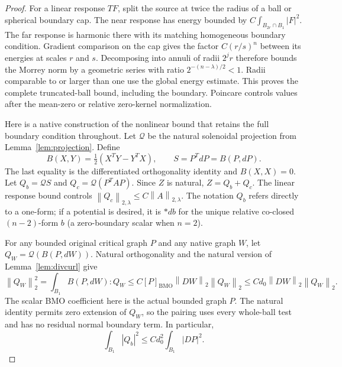 \documentclass[11pt,a4paper]{article}
\numberwithin{equation}{section}
\theoremstyle{definition}
\theoremstyle{remark}
\newcommand{\BMO}{\mathrm{BMO}}
\newcommand{\norm}[1]{\left\lVert#1\right\rVert}
\begin{document}
\begin{proof}
For a linear response $TF$, split the source at twice the radius of a
ball or spherical boundary cap. The near response has energy bounded
by $C\int_{B_{2r}\cap B_1}|F|^2$. The far response is harmonic there
with its matching homogeneous boundary condition. Gradient comparison
on the cap gives the factor $C(r/s)^n$ between its energies at scales
$r$ and $s$. Decomposing into annuli of radii $2^jr$ therefore bounds
the Morrey norm by a geometric series with ratio
$2^{-(n-\lambda)/2}<1$. Radii comparable to or larger than one use
the global energy estimate. This proves the complete truncated-ball
bound, including the boundary. Poincare controls values after the
mean-zero or relative zero-kernel normalization.

Here is a native construction of the nonlinear bound that retains
the full boundary condition throughout. Let $\mathcal Q$ be the
natural solenoidal projection from Lemma~\ref{lem:projection}. Define
\[
 B(X,Y)=\tfrac12(X^TY-Y^TX),\qquad S=P^TdP=B(P,dP).
\]
The last equality is the differentiated orthogonality identity and
$B(X,X)=0$. Let $Q_b=\mathcal Q S$ and
$Q_c=\mathcal Q(P^TAP)$. Since $Z$ is natural, $Z=Q_b+Q_c$.
The linear response bound controls
$\norm{Q_c}_{2,\lambda}\leq C\norm A_{2,\lambda}$.
The notation $Q_b$ refers directly to a one-form; if a potential is
desired, it is $*db$ for the unique relative co-closed $(n-2)$-form
$b$ (a zero-boundary scalar when $n=2$).

For any bounded original critical graph $P$ and any native graph $W$,
let $Q_W=\mathcal Q(B(P,dW))$. Natural orthogonality and the natural
version of Lemma~\ref{lem:divcurl} give
\begin{equation}\label{eq:nonlinear-full-energy}
 \norm{Q_W}_2^2=\int_{B_1}B(P,dW):Q_W
 \leq C[P]_{\BMO}\norm{DW}_2\norm{Q_W}_2
 \leq Cd_0\norm{DW}_2\norm{Q_W}_2.
\end{equation}
The scalar BMO coefficient here is the actual bounded graph $P$.
The natural identity permits zero extension of $Q_W$, so the pairing
uses every whole-ball test and has no residual normal boundary term.
In particular,
\begin{equation}\label{eq:nonlinear-global}
 \int_{B_1}|Q_b|^2\leq Cd_0^2\int_{B_1}|DP|^2.
\end{equation}


\end{proof}
\end{document}
